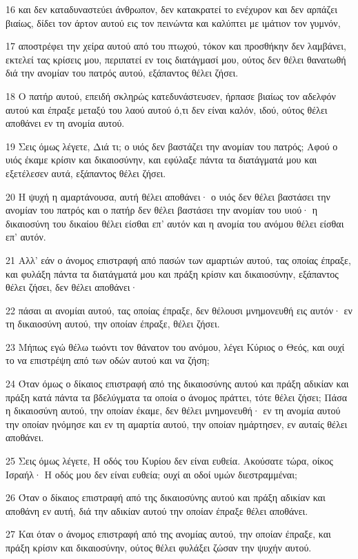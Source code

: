 \par 16 και δεν καταδυναστεύει άνθρωπον, δεν κατακρατεί το ενέχυρον και δεν αρπάζει βιαίως, δίδει τον άρτον αυτού εις τον πεινώντα και καλύπτει με ιμάτιον τον γυμνόν,
\par 17 αποστρέφει την χείρα αυτού από του πτωχού, τόκον και προσθήκην δεν λαμβάνει, εκτελεί τας κρίσεις μου, περιπατεί εν τοις διατάγμασί μου, ούτος δεν θέλει θανατωθή διά την ανομίαν του πατρός αυτού, εξάπαντος θέλει ζήσει.
\par 18 Ο πατήρ αυτού, επειδή σκληρώς κατεδυνάστευσεν, ήρπασε βιαίως τον αδελφόν αυτού και έπραξε μεταξύ του λαού αυτού ό,τι δεν είναι καλόν, ιδού, ούτος θέλει αποθάνει εν τη ανομία αυτού.
\par 19 Σεις όμως λέγετε, Διά τι; ο υιός δεν βαστάζει την ανομίαν του πατρός; Αφού ο υιός έκαμε κρίσιν και δικαιοσύνην, και εφύλαξε πάντα τα διατάγματά μου και εξετέλεσεν αυτά, εξάπαντος θέλει ζήσει.
\par 20 Η ψυχή η αμαρτάνουσα, αυτή θέλει αποθάνει· ο υιός δεν θέλει βαστάσει την ανομίαν του πατρός και ο πατήρ δεν θέλει βαστάσει την ανομίαν του υιού· η δικαιοσύνη του δικαίου θέλει είσθαι επ' αυτόν και η ανομία του ανόμου θέλει είσθαι επ' αυτόν.
\par 21 Αλλ' εάν ο άνομος επιστραφή από πασών των αμαρτιών αυτού, τας οποίας έπραξε, και φυλάξη πάντα τα διατάγματά μου και πράξη κρίσιν και δικαιοσύνην, εξάπαντος θέλει ζήσει, δεν θέλει αποθάνει·
\par 22 πάσαι αι ανομίαι αυτού, τας οποίας έπραξε, δεν θέλουσι μνημονευθή εις αυτόν· εν τη δικαιοσύνη αυτού, την οποίαν έπραξε, θέλει ζήσει.
\par 23 Μήπως εγώ θέλω τωόντι τον θάνατον του ανόμου, λέγει Κύριος ο Θεός, και ουχί το να επιστρέψη από των οδών αυτού και να ζήση;
\par 24 Όταν όμως ο δίκαιος επιστραφή από της δικαιοσύνης αυτού και πράξη αδικίαν και πράξη κατά πάντα τα βδελύγματα τα οποία ο άνομος πράττει, τότε θέλει ζήσει; Πάσα η δικαιοσύνη αυτού, την οποίαν έκαμε, δεν θέλει μνημονευθή· εν τη ανομία αυτού την οποίαν ηνόμησε και εν τη αμαρτία αυτού, την οποίαν ημάρτησεν, εν αυταίς θέλει αποθάνει.
\par 25 Σεις όμως λέγετε, Η οδός του Κυρίου δεν είναι ευθεία. Ακούσατε τώρα, οίκος Ισραήλ· Η οδός μου δεν είναι ευθεία; ουχί αι οδοί υμών διεστραμμέναι;
\par 26 Όταν ο δίκαιος επιστραφή από της δικαιοσύνης αυτού και πράξη αδικίαν και αποθάνη εν αυτή, διά την αδικίαν αυτού την οποίαν έπραξε θέλει αποθάνει.
\par 27 Και όταν ο άνομος επιστραφή από της ανομίας αυτού, την οποίαν έπραξε, και πράξη κρίσιν και δικαιοσύνην, ούτος θέλει φυλάξει ζώσαν την ψυχήν αυτού.
